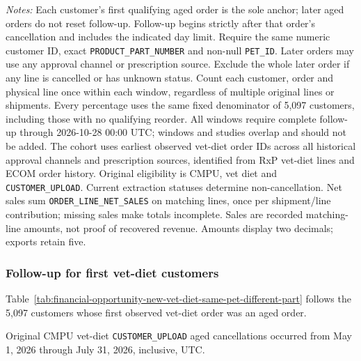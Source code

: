 \begin{table}[!htbp]
\begin{minipage}{\linewidth}
\footnotesize
\textit{Notes:} Each customer's first qualifying aged order is the sole anchor;
later aged orders do not reset follow-up. Follow-up begins strictly after that
order's cancellation and includes the indicated day limit. Require the same
numeric customer ID, exact \texttt{PRODUCT\_PART\_NUMBER} and non-null
\texttt{PET\_ID}. Later orders may use any approval channel or prescription
source. Exclude the whole later order if any line is cancelled or has unknown
status. Count each customer, order and physical line once within each window,
regardless of multiple original lines or shipments. Every percentage uses the
same fixed denominator of 5,097 customers, including those with no
qualifying reorder. All windows require complete follow-up through
2026-10-28 00:00 UTC; windows and studies overlap and should not be added.
The cohort uses earliest observed vet-diet order IDs across all historical approval channels and prescription sources, identified from RxP vet-diet lines and ECOM order history. Original eligibility is CMPU,
vet diet and \texttt{CUSTOMER\_UPLOAD}. Current extraction statuses determine
non-cancellation. Net sales sum \texttt{ORDER\_LINE\_NET\_SALES} on matching
lines, once per shipment/line contribution; missing sales make totals incomplete.
Sales are recorded matching-line amounts, not proof of recovered revenue.
Amounts display two decimals; exports retain five.
\end{minipage}
\end{table}

\clearpage
\subsubsection{Follow-up for first vet-diet customers}
Table~\ref{tab:financial-opportunity-new-vet-diet-same-pet-different-part} follows the
5,097 customers whose first observed vet-diet order was an aged order.

Original CMPU vet-diet
\texttt{CUSTOMER\_UPLOAD} aged cancellations occurred from
May 1, 2026 through July 31, 2026, inclusive, UTC.

